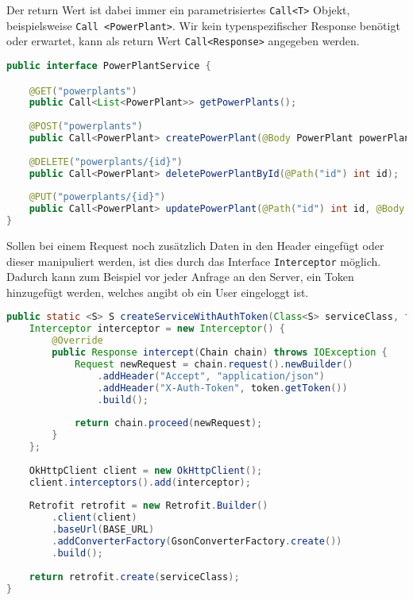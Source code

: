 Der return Wert ist dabei immer ein parametrisiertes \texttt{Call<T>} Objekt, beispielsweise \texttt{Call <PowerPlant>}. Wir kein typenspezifischer Response benötigt oder erwartet, kann als return Wert \texttt{Call<Response>} angegeben werden.
 
\begin{lstlisting}[language=java, caption={Auszug aus dem PowerPlantService},label={lst:retrofitPowerPlantService}, escapechar=|]
public interface PowerPlantService {

	@GET("powerplants")
	public Call<List<PowerPlant>> getPowerPlants();
	
	@POST("powerplants")
	public Call<PowerPlant> createPowerPlant(@Body PowerPlant powerPlant);
	
	@DELETE("powerplants/{id}")
	public Call<PowerPlant> deletePowerPlantById(@Path("id") int id); |\label{line:path}|
	
	@PUT("powerplants/{id}")
	public Call<PowerPlant> updatePowerPlant(@Path("id") int id, @Body PowerPlant powerPlant); |\label{line:body}|
}
\end{lstlisting}

Sollen bei einem Request noch zusätzlich Daten in den Header eingefügt oder dieser manipuliert werden, ist dies durch das Interface \texttt{Interceptor} möglich. Dadurch kann zum Beispiel vor jeder Anfrage an den Server, ein Token hinzugefügt werden, welches angibt ob ein User eingeloggt ist.

\begin{lstlisting}[language=java, caption={Hinzufügen des Tokens, für gültigen Login},label={lst:addToken}, escapechar=|]
public static <S> S createServiceWithAuthToken(Class<S> serviceClass, final AuthToken token) {
	Interceptor interceptor = new Interceptor() {
		@Override
		public Response intercept(Chain chain) throws IOException {
			Request newRequest = chain.request().newBuilder()
				.addHeader("Accept", "application/json")
				.addHeader("X-Auth-Token", token.getToken())
				.build();
		
			return chain.proceed(newRequest);
		}
	};
		
	OkHttpClient client = new OkHttpClient();
	client.interceptors().add(interceptor);
		
	Retrofit retrofit = new Retrofit.Builder()
		.client(client)
		.baseUrl(BASE_URL)
		.addConverterFactory(GsonConverterFactory.create())
		.build();
	
	return retrofit.create(serviceClass);
}
\end{lstlisting}


